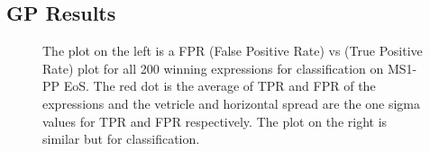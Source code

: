 \subsection{GP Results}



\begin{figure}[htp]
  \centering
  \quad
  \caption{The plot on the left is a FPR (False Positive Rate) vs (True Positive Rate) plot for all 200 winning expressions for \hasns classification on MS1-PP EoS. The red dot is the average of TPR and FPR of the expressions and the vetricle and horizontal spread are the one sigma values for TPR and FPR respectively. The plot on the right is similar but for \hasrem classification.  }
  \label{fig:FPR_TPR}
\end{figure}

